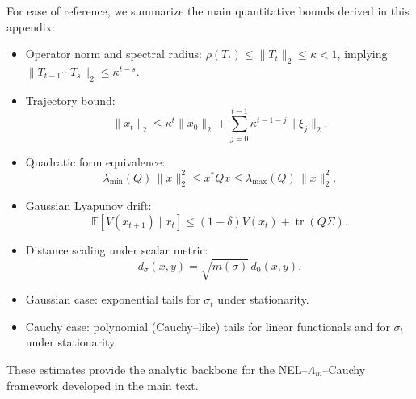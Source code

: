 \documentclass[11pt]{article}
\theoremstyle{plain}
\theoremstyle{definition}
\numberwithin{equation}{section}
\begin{document}
For ease of reference, we summarize the main quantitative bounds
derived in this appendix:

\begin{itemize}
  \item Operator norm and spectral radius: $\rho(T_t) \le \|T_t\|_2
  \le \kappa < 1$, implying $\|T_{t-1}\cdots T_s\|_2 \le \kappa^{t-s}$.

  \item Trajectory bound:
  \[
  \|x_t\|_2 \le \kappa^t \|x_0\|_2 + 
  \sum_{j=0}^{t-1} \kappa^{t-1-j} \|\xi_j\|_2.
  \]

  \item Quadratic form equivalence:
  \[
  \lambda_{\min}(Q)\,\|x\|_2^2
  \le x^\ast Q x
  \le \lambda_{\max}(Q)\,\|x\|_2^2.
  \]

  \item Gaussian Lyapunov drift:
  \[
  \mathbb{E}[V(x_{t+1}) \mid x_t]
  \le (1-\delta)V(x_t) + \operatorname{tr}(Q\Sigma).
  \]

  \item Distance scaling under scalar metric:
  \[
  d_\sigma(x,y) = \sqrt{m(\sigma)}\, d_0(x,y).
  \]

  \item Gaussian case:
  exponential tails for $\sigma_t$ under stationarity.

  \item Cauchy case:
  polynomial (Cauchy--like) tails for linear functionals and for
  $\sigma_t$ under stationarity.
\end{itemize}

These estimates provide the analytic backbone for the NEL--$\Lambda_m$--Cauchy
framework developed in the main text.

\nocite{*}


\end{document}
